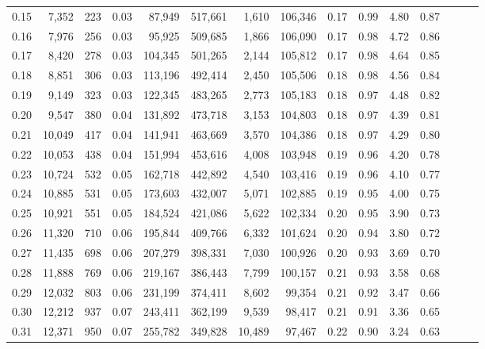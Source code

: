 \begin{tabular}{rrrrrrrrrrrrrrr}
0.15 &   7,352 &    223 &  0.03 &   87,949 &  517,661 &    1,610 &  106,346 &  0.17 &  0.99 &  4.80 &      0.87 \\
0.16 &   7,976 &    256 &  0.03 &   95,925 &  509,685 &    1,866 &  106,090 &  0.17 &  0.98 &  4.72 &      0.86 \\
0.17 &   8,420 &    278 &  0.03 &  104,345 &  501,265 &    2,144 &  105,812 &  0.17 &  0.98 &  4.64 &      0.85 \\
0.18 &   8,851 &    306 &  0.03 &  113,196 &  492,414 &    2,450 &  105,506 &  0.18 &  0.98 &  4.56 &      0.84 \\
0.19 &   9,149 &    323 &  0.03 &  122,345 &  483,265 &    2,773 &  105,183 &  0.18 &  0.97 &  4.48 &      0.82 \\
0.20 &   9,547 &    380 &  0.04 &  131,892 &  473,718 &    3,153 &  104,803 &  0.18 &  0.97 &  4.39 &      0.81 \\
0.21 &  10,049 &    417 &  0.04 &  141,941 &  463,669 &    3,570 &  104,386 &  0.18 &  0.97 &  4.29 &      0.80 \\
0.22 &  10,053 &    438 &  0.04 &  151,994 &  453,616 &    4,008 &  103,948 &  0.19 &  0.96 &  4.20 &      0.78 \\
0.23 &  10,724 &    532 &  0.05 &  162,718 &  442,892 &    4,540 &  103,416 &  0.19 &  0.96 &  4.10 &      0.77 \\
0.24 &  10,885 &    531 &  0.05 &  173,603 &  432,007 &    5,071 &  102,885 &  0.19 &  0.95 &  4.00 &      0.75 \\
0.25 &  10,921 &    551 &  0.05 &  184,524 &  421,086 &    5,622 &  102,334 &  0.20 &  0.95 &  3.90 &      0.73 \\
0.26 &  11,320 &    710 &  0.06 &  195,844 &  409,766 &    6,332 &  101,624 &  0.20 &  0.94 &  3.80 &      0.72 \\
0.27 &  11,435 &    698 &  0.06 &  207,279 &  398,331 &    7,030 &  100,926 &  0.20 &  0.93 &  3.69 &      0.70 \\
0.28 &  11,888 &    769 &  0.06 &  219,167 &  386,443 &    7,799 &  100,157 &  0.21 &  0.93 &  3.58 &      0.68 \\
0.29 &  12,032 &    803 &  0.06 &  231,199 &  374,411 &    8,602 &   99,354 &  0.21 &  0.92 &  3.47 &      0.66 \\
0.30 &  12,212 &    937 &  0.07 &  243,411 &  362,199 &    9,539 &   98,417 &  0.21 &  0.91 &  3.36 &      0.65 \\
0.31 &  12,371 &    950 &  0.07 &  255,782 &  349,828 &   10,489 &   97,467 &  0.22 &  0.90 &  3.24 &      0.63 \\

\end{tabular}
